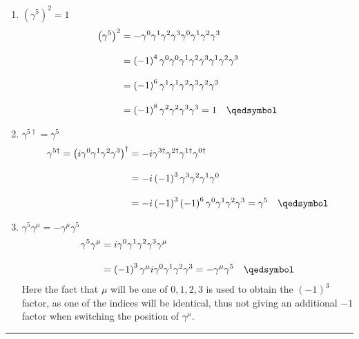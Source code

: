 \begin{solution}
    \begin{enumerate}[label=(\alph*)]
        \item $\left(\gamma^5\right)^2 = 1 $
            \begin{align*}
                \left(\gamma^5\right)^2 &= -\gamma^0\gamma^1\gamma^2\gamma^3 \gamma^0\gamma^1\gamma^2\gamma^3 \\[0.12in]
                                        &= \left(-1\right)^4 \gamma^0\gamma^0 \gamma^1\gamma^2\gamma^3 \gamma^1\gamma^2\gamma^3 \\[0.12in]
                                        &= \left(-1\right)^6  \gamma^1  \gamma^1 \gamma^2\gamma^3\gamma^2\gamma^3 \\[0.12in]
                                        &= \left(-1\right)^8  \gamma^2\gamma^2 \gamma^3\gamma^3 = 1 \qed
            \end{align*}
        \item $\gamma^{5\dagger} = \gamma^5$
            \begin{align*}
                \gamma^{5\dagger} = \left(i\gamma^0\gamma^1\gamma^2\gamma^3\right)^\dagger &= -i\gamma^{3\dagger}\gamma^{2\dagger}\gamma^{1\dagger}\gamma^{0\dagger} \\[0.12in]
                &= -i \left(-1\right)^3 \gamma^3 \gamma^2 \gamma^1 \gamma^0 \\[0.12in]
                &= -i \left(-1\right)^3 \left(-1\right)^6 \gamma^0\gamma^1\gamma^2\gamma^3 = \gamma^5 \qed
            \end{align*}
        \item $\gamma^5\gamma^\mu = - \gamma^\mu\gamma^5$
            \begin{align*}
                \gamma^5\gamma^\mu &=  i\gamma^0\gamma^1\gamma^2\gamma^3 \gamma^\mu \\[0.12in]
                                   &= \left(-1\right)^3 \gamma^\mu i\gamma^0\gamma^1\gamma^2\gamma^3 = -\gamma^\mu \gamma^5 \qed \\
            \end{align*}
            Here the fact that $\mu$ will be one of $0,1,2,3$ is used to obtain the $\left(-1\right)^3$ factor, as one of the indices will be identical, thus not giving an additional $-1$ factor when switching the position of $\gamma^\mu$.
    \end{enumerate}
\end{solution}

\noindent\rule{7in}{1.5pt}

